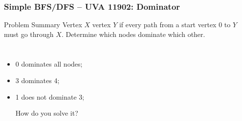 \documentclass{beamer}
\begin{document}
\begin{frame}
  \frametitle{Simple BFS/DFS -- UVA 11902: Dominator}
  {\smaller
  \begin{block}{Problem Summary}
    Vertex $X$  vertex $Y$ if every path from a
    start vertex $0$ to $Y$ must go through $X$. Determine which
    nodes dominate which other.
  \end{block}}

  \vspace{1cm}

  \begin{center}
    \begin{columns}[T]
      \begin{itemize}
      \item 0 dominates all nodes;
      \item 3 dominates 4;
      \item 1 does not dominate 3;

        \bigskip

        How do you solve it?

      \end{itemize}
    \end{columns}
  \end{center}
\end{frame}
\end{document}
